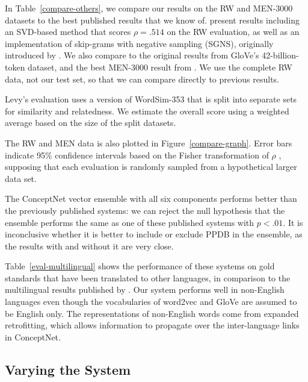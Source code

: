 \documentclass[11pt,letterpaper]{article}
\begin{document}
In Table~\ref{compare-others}, we compare our results on the RW and MEN-3000
datasets to the best published results that we know of.
 present results including an SVD-based method that
scores $\rho = .514$ on the RW evaluation, as well as an implementation of
skip-grams with negative sampling (SGNS), originally introduced by
. We also compare to the original results from
GloVe's 42-billion-token dataset, and the best MEN-3000 result from
. We use the complete RW data, not our test
set, so that we can compare directly to previous results.

Levy's evaluation uses a version of WordSim-353 that is split into separate
sets for similarity and relatedness. We estimate the overall score using a
weighted average based on the size of the split datasets.

The RW and MEN data is also plotted in Figure~\ref{compare-graph}. Error bars
indicate 95\% confidence intervals based on the Fisher transformation of $\rho$
\cite{fisher1915frequency}, supposing that each evaluation is randomly sampled
from a hypothetical larger data set.

The ConceptNet vector ensemble with all six components performs better than the
previously published systems: we can reject the null hypothesis that the
ensemble performs the same as one of these published systems with $p < .01$.
It is inconclusive whether it is better to include or exclude PPDB in the
ensemble, as the results with and without it are very close.

Table~\ref{eval-multilingual} shows the performance of these systems on
gold standards that have been translated to other languages, in comparison to
the multilingual results published by . Our
system performs well in non-English languages even though the vocabularies of
word2vec and GloVe are assumed to be English only. The representations of
non-English words come from expanded retrofitting, which allows information to
propagate over the inter-language links in ConceptNet.

\subsection{Varying the System}
\label{variations}
\end{document}
